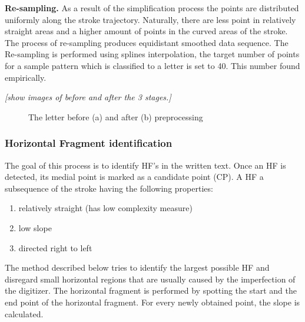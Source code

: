 \documentclass[journal,compsoc]{IEEEtran}
\begin{document}
\textbf{Re-sampling.} As a result of the simplification process the points are distributed uniformly along the stroke trajectory. Naturally, there are less point in relatively straight areas and a higher amount of points in the curved areas of the stroke. The process of re-sampling produces equidistant smoothed data sequence. The Re-sampling is performed using splines interpolation, the target number of points for a sample pattern which is classified to a letter is set to 40. This number found empirically.

\emph{[show images of before and after the 3 stages.]}
 
\begin{figure}
	\centering
    \caption{The letter  before (a) and after (b) preprocessing}
   \label{fig:same_main_body_letters}
\end{figure}

\subsubsection{Horizontal Fragment identification}
The goal of this process is to identify HF's in the written text. Once an HF is detected, its medial point is marked as a candidate point (CP). A HF a subsequence of the stroke having the following properties: 
\begin{enumerate}
\item relatively straight (has low complexity measure)
\item low slope
\item directed right to left 
\end{enumerate}
The method described below tries to identify the largest possible HF and disregard small horizontal regions that are usually caused by the imperfection of the digitizer. 
The horizontal fragment is performed by spotting the start and the end point of the horizontal fragment. For every newly obtained point, the slope is calculated.\\
\end{document}
